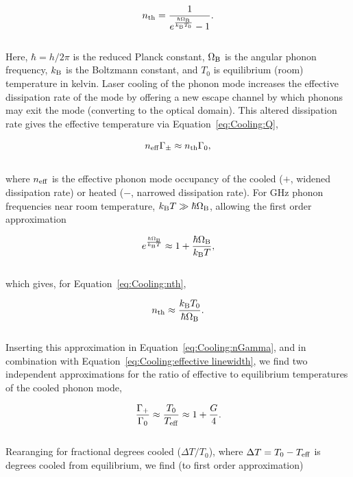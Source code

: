\begin{equation}
  n_{\rm th} = \frac{1}{e^\frac{\hbar\Omega_{\rm B}}{k_{\rm B}T_{0}} - 1}.
  \label{eq:Cooling:nth}
\end{equation}
\\
Here, \(\hbar = h/2\pi\) is the reduced Planck constant, \(\Omega_{\rm B}\) is the angular phonon frequency, \(k_{\rm B}\) is the Boltzmann constant, and \(T_{0}\) is equilibrium (room) temperature in kelvin. Laser cooling of the phonon mode increases the effective dissipation rate of the mode by offering a new escape channel by which phonons may exit the mode (converting to the optical domain). This altered dissipation rate gives the effective temperature via Equation~\ref{eq:Cooling:Q},

\begin{equation}
  n_{\rm eff}\Gamma_{\pm} \approx n_{\rm th}\Gamma_{0},
  \label{eq:Cooling:nGamma}
\end{equation}
\\
where \(n_{\rm eff}\) is the effective phonon mode occupancy of the cooled (\(+\), widened dissipation rate) or heated (\(-\), narrowed dissipation rate). For \si{\giga\hertz} phonon frequencies near room temperature, \(k_{\rm B}T \gg \hbar\Omega_{\rm B}\), allowing the first order approximation

\begin{equation}
  e^{\frac{\hbar\Omega_{\rm B}}{k_{\rm B}T}} \approx 1 + \frac{\hbar\Omega_{\rm B}}{k_{\rm B}T},
\end{equation}
\\
which gives, for Equation~\ref{eq:Cooling:nth},

\begin{equation}
  n_{\rm th} \approx \frac{k_{\rm B}T_{0}}{\hbar\Omega_{\rm B}}.
\end{equation}
\\
Inserting this approximation in Equation~\ref{eq:Cooling:nGamma}, and in combination with Equation~\ref{eq:Cooling:effective linewidth}, we find two independent approximations for the ratio of effective to equilibrium temperatures of the cooled phonon mode,

\begin{equation}
  \frac{\Gamma_{+}}{\Gamma_{0}} \approx \frac{T_{0}}{T_{\rm eff}} \approx 1 + \frac{G}{4}.
\end{equation}
\\
Rearanging for fractional degrees cooled (\(\Delta T/T_{0}\)), where \(\Delta T = T_{0} - T_{\rm eff}\) is degrees cooled from equilibrium, we find (to first order approximation)

